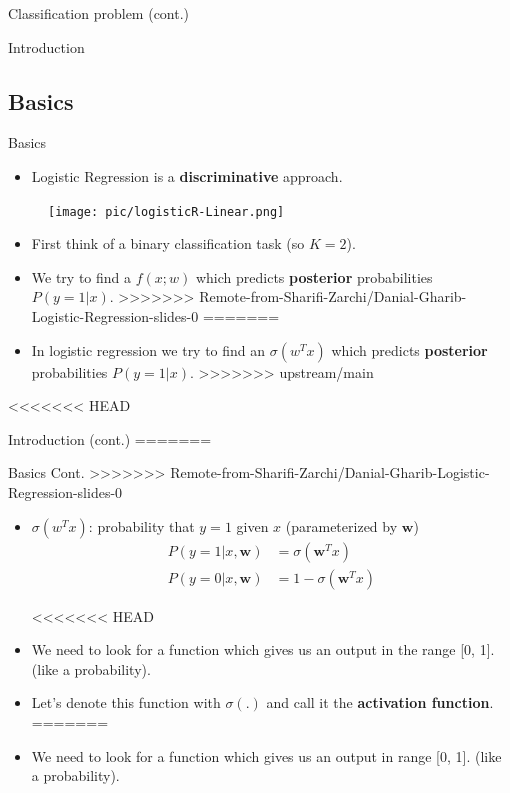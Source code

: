 \documentclass[serif, aspectratio=169]{beamer}
\begin{document}
\begin{frame}{Classification problem (cont.)}
\begin{itemize}
\begin{frame}{Introduction}
\begin{itemize}
\subsection{Basics}


\begin{frame}{Basics}
    \begin{itemize}
        \item Logistic Regression is a \textbf{discriminative} approach.
    \end{itemize}
    \begin{figure}[h]
      \centering
      \texttt{[image: pic/logisticR-Linear.png]}
    \end{figure}
    \begin{itemize}
        \item First think of a binary classification task (so $K=2$).
        \item We try to find a $f(x;w)$ which predicts \textbf{posterior} probabilities $P(y=1|x)$.
>>>>>>> Remote-from-Sharifi-Zarchi/Danial-Gharib-Logistic-Regression-slides-0
=======
        \item In logistic regression we try to find an $\sigma (w^Tx)$ which predicts \textbf{posterior} probabilities $P(y=1|x)$.
>>>>>>> upstream/main
    \end{itemize}
    
\end{frame}
<<<<<<< HEAD
\begin{frame}{Introduction (cont.)}
=======
\begin{frame}{Basics Cont.}
>>>>>>> Remote-from-Sharifi-Zarchi/Danial-Gharib-Logistic-Regression-slides-0
    \begin{itemize}
        \item $\sigma (w^Tx)$: probability that $y=1$ given $x$ (parameterized by \textbf{$\textbf{w}$})
      \begin{align*}
        P(y=1|x,\mathbf{w}) &= \sigma (\mathbf{w}^Tx) \\
        P(y=0|x,\mathbf{w}) &= 1 - \sigma (\mathbf{w}^Tx)
      \end{align*}

<<<<<<< HEAD
        \item We need to look for a function which gives us an output in the range [0, 1]. (like a probability).

        \item Let's denote this function with $\sigma (.)$ and call it the \textbf{activation function}.
=======
        \item We need to look for a function which gives us an output in range [0, 1]. (like a probability).


\end{itemize}
\end{frame}
\end{frame}
\end{itemize}
\end{frame}
\end{itemize}
\end{frame}
\end{document}

